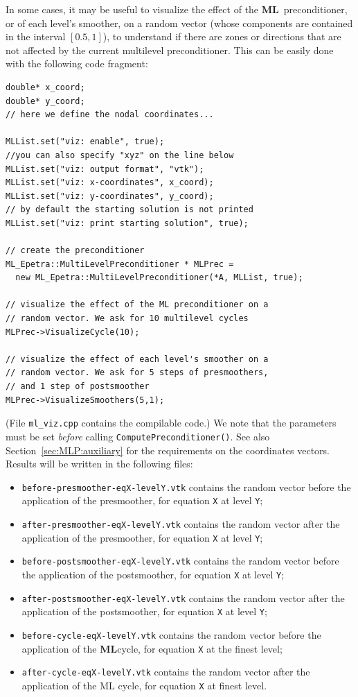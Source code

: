 \documentclass{article}[11pt]
\newcommand{\ML}     {{\bf ML}}
\begin{document}
In some cases, it may be useful to visualize the effect of the \ML~preconditioner, or of each level's smoother, on
a random vector (whose components are contained in the interval $[0.5,1]$), 
to understand if there are zones or directions that are not
affected by the current multilevel preconditioner. This can be easily 
done with the following code fragment:
\begin{verbatim}
double* x_coord;
double* y_coord;
// here we define the nodal coordinates...

MLList.set("viz: enable", true);
//you can also specify "xyz" on the line below
MLList.set("viz: output format", "vtk");
MLList.set("viz: x-coordinates", x_coord);
MLList.set("viz: y-coordinates", y_coord);
// by default the starting solution is not printed
MLList.set("viz: print starting solution", true);

// create the preconditioner
ML_Epetra::MultiLevelPreconditioner * MLPrec = 
  new ML_Epetra::MultiLevelPreconditioner(*A, MLList, true);

// visualize the effect of the ML preconditioner on a 
// random vector. We ask for 10 multilevel cycles
MLPrec->VisualizeCycle(10);

// visualize the effect of each level's smoother on a
// random vector. We ask for 5 steps of presmoothers,
// and 1 step of postsmoother
MLPrec->VisualizeSmoothers(5,1);
\end{verbatim}
(File \verb!ml_viz.cpp! contains the compilable
 code.) We note that the parameters must be set {\sl before} calling
{\tt ComputePreconditioner()}. See also Section~\ref{sec:MLP:auxiliary} for
the requirements on the coordinates vectors.
Results will be written in the following files:
\begin{itemize}
\item \verb!before-presmoother-eqX-levelY.vtk! contains the random vector
before
the application of the presmoother, for equation \verb!X! at level 
\verb!Y!;
\item \verb!after-presmoother-eqX-levelY.vtk! contains the random vector after
the application of the presmoother, for equation \verb!X! at level
\verb!Y!;
\item \verb!before-postsmoother-eqX-levelY.vtk! contains the random vector
before
the application of the postsmoother, for equation \verb!X! at level
\verb!Y!;
\item \verb!after-postsmoother-eqX-levelY.vtk! contains the random vector after
the application of the postsmoother, for equation \verb!X! at level
\verb!Y!;
\item \verb!before-cycle-eqX-levelY.vtk! contains the random vector
before
the application of the \ML cycle, for equation \verb!X! at the finest level;
\item \verb!after-cycle-eqX-levelY.vtk! contains the random vector after
the application of the ML cycle, for equation \verb!X! at finest level.
\end{itemize}
\end{document}
